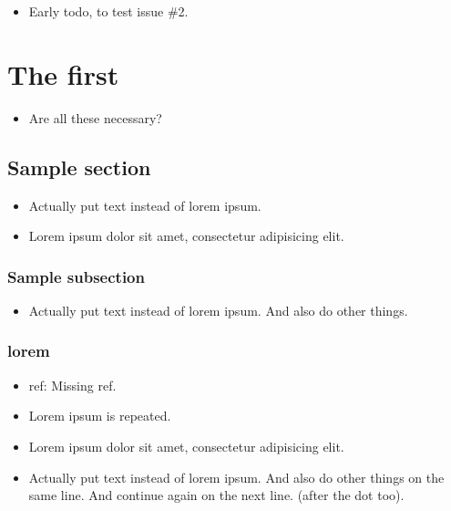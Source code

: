     \begin{itemize}[noitemsep]
        \item {\color{red}Early todo, to test issue \#2.}
    \end{itemize}
\chapter{The first}
\label{autosec:0}
    \begin{itemize}[noitemsep]
        \item {\color{ForestGreen}Are all these necessary?}
    \end{itemize}
\section{Sample section}
\label{autosec:1}
    \begin{itemize}[noitemsep]
        \item {\color{red}Actually put text instead of lorem ipsum.}
        \item Lorem ipsum dolor sit amet, consectetur adipisicing elit.
    \end{itemize}
\subsection{Sample subsection}
\label{autosec:2}
    \begin{itemize}[noitemsep]
        \item {\color{red}Actually put text instead of lorem ipsum.}
{\color{red}And also do other things.}
    \end{itemize}
\subsection{lorem}
\label{autosec:3}
    \begin{itemize}[noitemsep]
        \item {\color{Periwinkle}ref: Missing ref.}
        \item {\color{DarkOrchid}Lorem ipsum is repeated.}
        \item Lorem ipsum dolor sit amet, consectetur adipisicing elit.
        \item {\color{red}Actually put text instead of lorem ipsum. And also do other things on the same line.}
{\color{red}And continue again on the next line. (after the dot too).}
    \end{itemize}
